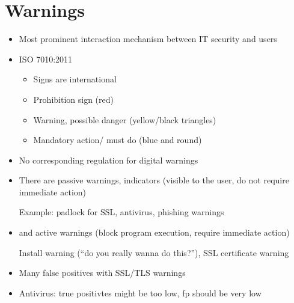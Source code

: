 \documentclass[a4paper,12pt]{scrartcl}
\begin{document}
\section{Warnings}
\begin{itemize}
	\item
		Most prominent interaction mechanism between IT security and users
	\item
		ISO 7010:2011
		\begin{itemize}
			\item
				Signs are international
			\item
				Prohibition sign (red)
			\item
				Warning, possible danger (yellow/black triangles)
			\item
				Mandatory action/ must do (blue and round)
		\end{itemize}
	\item
		No corresponding regulation for digital warnings
	\item
		There are passive warnings, indicators (visible to the user, do not require immediate action)

		Example: padlock for SSL, antivirus, phishing warnings
	\item
		and active warnings (block program execution, require immediate action)

		Install warning (\enquote{do you really wanna do this?}), SSL certificate warning
	\item
		Many false positives with SSL/TLS warnings
	\item
		Antivirus: true positivtes might be too low, fp should be very low
\end{itemize}
\end{document}

